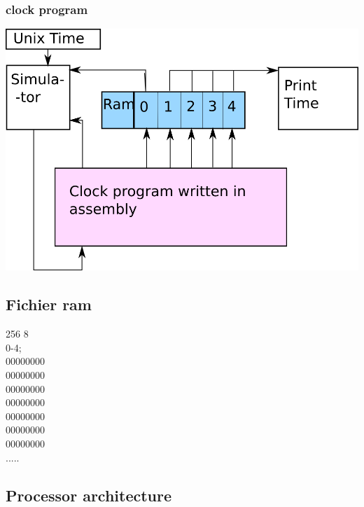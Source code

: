 \documentclass[c]{beamer}
\begin{document}
\begin{frame}
\frametitle{clock program}
\includegraphics[scale = 0.3]{clock.png}
\end{frame}

\subsection{Fichier ram}

\begin{frame}
256 8 \\
0-4;  \\
00000000\\
00000000\\
00000000\\
00000000\\
00000000\\
00000000\\
00000000\\
.....
\end{frame}

\subsection{Processor architecture}
\end{document}
